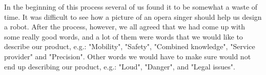In the beginning of this process several of us found it to be somewhat a waste of time. It was difficult to see how a picture of an opera singer should help us design a robot. After the process, however, we all agreed that we had come up with some really good words, and a lot of them were words that we would like to describe our product, e.g.: "Mobility", "Safety", "Combined knowledge", "Service provider" and "Precision". Other words we would have to make sure would not end up describing our product, e.g.: "Loud", "Danger", and "Legal issues". 